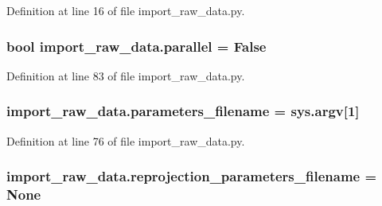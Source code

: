 Definition at line 16 of file import\+\_\+raw\+\_\+data.\+py.

\subsubsection[{\texorpdfstring{parallel}{parallel}}]{\setlength{\rightskip}{0pt plus 5cm}bool import\+\_\+raw\+\_\+data.\+parallel = False}\hypertarget{namespaceimport__raw__data_ac99480314bdf9fb8a8c1d14fb1122cff}{}\label{namespaceimport__raw__data_ac99480314bdf9fb8a8c1d14fb1122cff}


Definition at line 83 of file import\+\_\+raw\+\_\+data.\+py.

\subsubsection[{\texorpdfstring{parameters\+\_\+filename}{parameters_filename}}]{\setlength{\rightskip}{0pt plus 5cm}import\+\_\+raw\+\_\+data.\+parameters\+\_\+filename = sys.\+argv\mbox{[}1\mbox{]}}\hypertarget{namespaceimport__raw__data_a1b02f66a97982e45aae04a6c40ee305d}{}\label{namespaceimport__raw__data_a1b02f66a97982e45aae04a6c40ee305d}


Definition at line 76 of file import\+\_\+raw\+\_\+data.\+py.

\subsubsection[{\texorpdfstring{reprojection\+\_\+parameters\+\_\+filename}{reprojection_parameters_filename}}]{\setlength{\rightskip}{0pt plus 5cm}import\+\_\+raw\+\_\+data.\+reprojection\+\_\+parameters\+\_\+filename = None}\hypertarget{namespaceimport__raw__data_a2aaddd5fd16ca08c014768394441e536}{}\label{namespaceimport__raw__data_a2aaddd5fd16ca08c014768394441e536}


